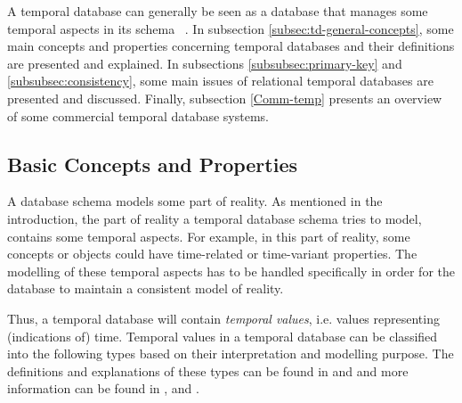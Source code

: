 %
%
A temporal database can generally be seen as a database that manages some temporal aspects in its schema \cite{etzion1998}~\cite{Billiet:Pons:Matthe:DeTre:Pons:2011:BipolarFuzzy}. In subsection \ref{subsec:td-general-concepts}, some main concepts and properties concerning temporal databases and their definitions are presented and explained. In subsections \ref{subsubsec:primary-key} and \ref{subsubsec:consistency}, some main issues of relational temporal databases are presented and discussed. Finally, subsection \ref{Comm-temp} presents an overview of some commercial temporal database systems.

\subsection{\label{subsec:td-general-concepts}Basic Concepts and Properties}
A database schema models some part of reality. As mentioned in the introduction, the part of reality a temporal database schema tries to model, contains some temporal aspects. For example, in this part of reality, some concepts or objects could have time-related or time-variant properties. The modelling of these temporal aspects has to be handled specifically in order for the database to maintain a consistent model of reality.

Thus, a temporal database will contain \emph{temporal values}, i.e. values representing (indications of) time. Temporal values in a temporal database can be classified into the following types based on their interpretation and modelling purpose. The definitions and explanations of these types can be found in \cite{Dyreson1994} and \cite{Nascimento95decisiontime} and more information can be found in \cite{Jensen:1991:IIM:627283.627484}, \cite{Snodgrass:1984:TQL:588011.588041} and \cite{Nascimento95decisiontime}.

